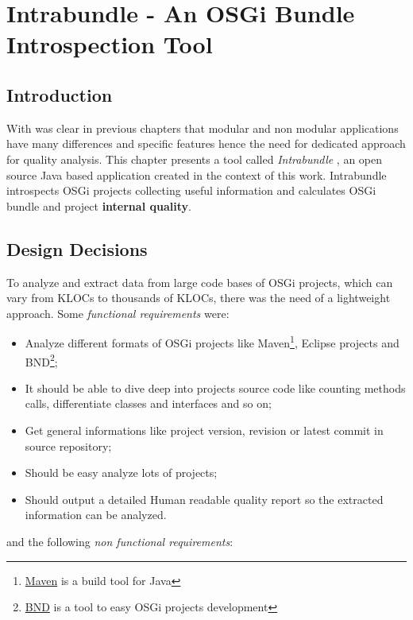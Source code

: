 \chapter{Intrabundle - An OSGi Bundle Introspection Tool}


\section{Introduction}
With was clear in previous chapters that modular and non modular applications have many differences and specific features hence the need for dedicated approach for quality analysis. This chapter presents a tool called \emph{Intrabundle} \citep{intrabundle github 2014}, an open source Java based application created in the context of this work. Intrabundle introspects OSGi projects collecting useful information and calculates OSGi bundle and project \textbf{internal quality}.  


\section{Design Decisions}
To analyze and extract data from large code bases of OSGi projects, which can vary from KLOCs to thousands of KLOCs, there was the need of a lightweight approach. Some \emph{functional requirements} were:

\begin{itemize}
\item Analyze different formats of OSGi projects like Maven\footnote{\href{http://maven.apache.org/index.html}{Maven} is a build tool for Java}, Eclipse projects and BND\footnote{\href{http://bndtools.org/}{BND} is a tool to easy OSGi projects development}; 
\item It should be able to dive deep into projects source code like counting methods calls, differentiate classes and interfaces and so on;  
\item Get general informations like project version, revision or latest commit in source repository;
\item Should be easy analyze lots of projects;
\item Should output a detailed Human readable quality report so the extracted information can be analyzed.
\end{itemize}

and the following \emph{non functional requirements}:

